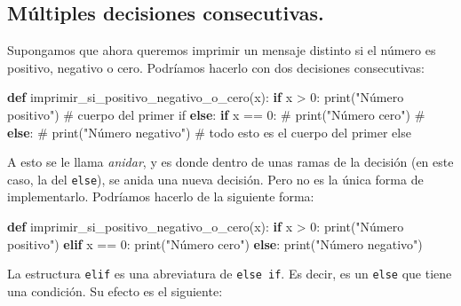 \documentclass[
  letterpaper,
  DIV=11,
  numbers=noendperiod]{scrreprt}
\newenvironment{Shaded}{\begin{snugshade}}{\end{snugshade}}
\newcommand{\BuiltInTok}[1]{\textcolor[rgb]{0.00,0.23,0.31}{#1}}
\newcommand{\CommentTok}[1]{\textcolor[rgb]{0.37,0.37,0.37}{#1}}
\newcommand{\ControlFlowTok}[1]{\textcolor[rgb]{0.00,0.23,0.31}{\textbf{#1}}}
\newcommand{\DecValTok}[1]{\textcolor[rgb]{0.68,0.00,0.00}{#1}}
\newcommand{\KeywordTok}[1]{\textcolor[rgb]{0.00,0.23,0.31}{\textbf{#1}}}
\newcommand{\NormalTok}[1]{\textcolor[rgb]{0.00,0.23,0.31}{#1}}
\newcommand{\OperatorTok}[1]{\textcolor[rgb]{0.37,0.37,0.37}{#1}}
\newcommand{\StringTok}[1]{\textcolor[rgb]{0.13,0.47,0.30}{#1}}
\begin{document}
\subsection{Múltiples decisiones
consecutivas.}\label{muxfaltiples-decisiones-consecutivas.}

Supongamos que ahora queremos imprimir un mensaje distinto si el número
es positivo, negativo o cero. Podríamos hacerlo con dos decisiones
consecutivas:

\begin{Shaded}
\begin{Highlighting}[]
\KeywordTok{def}\NormalTok{ imprimir\_si\_positivo\_negativo\_o\_cero(x):}
  \ControlFlowTok{if}\NormalTok{ x }\OperatorTok{\textgreater{}} \DecValTok{0}\NormalTok{:}
      \BuiltInTok{print}\NormalTok{(}\StringTok{"Número positivo"}\NormalTok{) }\CommentTok{\# cuerpo del primer if}
  \ControlFlowTok{else}\NormalTok{:}
      \ControlFlowTok{if}\NormalTok{ x }\OperatorTok{==} \DecValTok{0}\NormalTok{:                      }\CommentTok{\#}
          \BuiltInTok{print}\NormalTok{(}\StringTok{"Número cero"}\NormalTok{)        }\CommentTok{\#}
      \ControlFlowTok{else}\NormalTok{:                           }\CommentTok{\#}
          \BuiltInTok{print}\NormalTok{(}\StringTok{"Número negativo"}\NormalTok{)    }\CommentTok{\# todo esto es el cuerpo del primer else}
\end{Highlighting}
\end{Shaded}

A esto se le llama \emph{anidar}, y es donde dentro de unas ramas de la
decisión (en este caso, la del \texttt{else}), se anida una nueva
decisión. Pero no es la única forma de implementarlo. Podríamos hacerlo
de la siguiente forma:

\begin{Shaded}
\begin{Highlighting}[]
\KeywordTok{def}\NormalTok{ imprimir\_si\_positivo\_negativo\_o\_cero(x):}
  \ControlFlowTok{if}\NormalTok{ x }\OperatorTok{\textgreater{}} \DecValTok{0}\NormalTok{:}
      \BuiltInTok{print}\NormalTok{(}\StringTok{"Número positivo"}\NormalTok{)}
  \ControlFlowTok{elif}\NormalTok{ x }\OperatorTok{==} \DecValTok{0}\NormalTok{:}
      \BuiltInTok{print}\NormalTok{(}\StringTok{"Número cero"}\NormalTok{)}
  \ControlFlowTok{else}\NormalTok{:}
      \BuiltInTok{print}\NormalTok{(}\StringTok{"Número negativo"}\NormalTok{)}
\end{Highlighting}
\end{Shaded}

La estructura \texttt{elif} es una abreviatura de \texttt{else\ if}. Es
decir, es un \texttt{else} que tiene una condición. Su efecto es el
siguiente:
\end{document}
